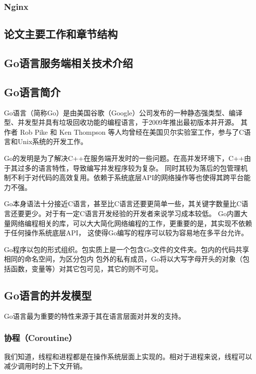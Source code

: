 \documentclass[twoside]{CUGThesis}
\begin{document}
	\subsubsection{Nginx}

	\subsection{论文主要工作和章节结构}
	
	
	\begin{spacing}{2}
		\section{Go语言服务端相关技术介绍}
	\end{spacing}
	\subsection{Go语言简介}
	Go语言（简称Go）是由美国谷歌（Google）公司发布的一种静态强类型、编译型、并发型并具有垃圾回收功能的编程语言，于2009年推出最初版本并开源。
	其作者 Rob Pike 和 Ken Thompson 等人均曾经在美国贝尔实验室工作，参与了C语言和Unix系统的开发工作。\par 
	Go的发明是为了解决C++在服务端开发时的一些问题。在高并发环境下，C++由于其过多的语言特性，导致编写并发程序较为复杂。
	同时其较为落后的包管理机制不利于对代码的高效复用。依赖于系统底层API的网络操作等也使得其跨平台能力不强。\par
	Go本身语法十分接近C语言，甚至比C语言还要更简单一些，其关键字数量比C语言还要更少。对于有一定C语言开发经验的开发者来说学习成本较低。
	Go内置大量网络编程相关的库，可以大大简化网络编程的工作，更重要的是，其实现不依赖于任何操作系统底层API，
	这使得Go编写的程序可以较为容易地在多平台允许。\par
	Go程序以包的形式组织。包实质上是一个包含Go文件的文件夹。包内的代码共享相同的命名空间，为区分包内
	包外的私有成员，Go将以大写字母开头的对象（包括函数，变量等）对其它包可见，其它的则不可见。\par 
	\subsection{Go语言的并发模型}
	Go语言最为重要的特性来源于其在语言层面对并发的支持。
	\subsubsection{协程（Coroutine）}
	我们知道，线程和进程都是在操作系统层面上实现的。相对于进程来说，线程可以减少调用时的上下文开销。
\end{document}
